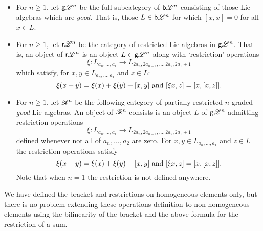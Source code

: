 \documentclass[11pt]{article}
\newcommand{\GS}[1]{\scrE^{#1}}
\newcommand{\RestLie}[1]{\mathsf{r}{\scrL}^{#1}}%
\newcommand{\GoodLie}[1]{\mathsf{g}{\scrL}^{#1}}%
\newcommand{\BadLie}[1]{\mathsf{b}{\scrL}^{#1}}%
\newcommand{\PRLie}[1]{\scrR^{#1}}%
\newcommand{\restn}[1]{\xi{#1}}
\newcommand{\Fr}[1]{#1}%
\begin{document}
\begin{CategoriesOfInterest}
\begin{itemize}
\item For $n\geq1$, let $\GoodLie{n}$ be the full subcategory of $\BadLie{n}$ consisting of those Lie algebras which are \emph{good}. That is, those $L\in\BadLie{n}$ for which $[x,x]=0$ for all $x\in L$.
\item For $n\geq1$, let $\RestLie{n}$ be the category of restricted Lie algebras in $\GoodLie{n}$. That is, an object of $\RestLie{n}$ is an object $L\in\GoodLie{n}$ along with `restriction' operations
\[\restn{}:L_{a_n,\ldots,a_1}\to L_{2a_n,2a_{n-1},\ldots,2a_2,2a_1+1}\]
which satisfy, for $x,y\in L_{a_n,\ldots,a_1}$ and $z\in L$: \[\restn{(x+y)}=\restn{(x)}+\restn{(y)}+[x,y]\textup{ and }[\restn{x},z]=[x,[x,z]].\]
\item For $n\geq1$, let $\PRLie{n}$ be the following category of partially restricted $n$-graded \emph{good} Lie algebras. An object of $\PRLie{n}$ consists is an object $L$ of $\GoodLie{n}$
admitting restriction operations
\[\restn{}:L_{a_n,\ldots,a_1}\to L_{2a_n,2a_{n-1},\ldots,2a_2,2a_1+1}\]
defined whenever not all of $a_n,\ldots,a_{2}$ are zero. %
For $x,y\in L_{a_n,\ldots,a_1}$ and $z\in L$ the restriction operations satisfy \[\restn{(x+y)}=\restn{(x)}+\restn{(y)}+[x,y]\textup{ and }[\restn{x},z]=[x,[x,z]].\]
Note that when $n=1$ the restriction is not defined anywhere.
\end{itemize}
We have defined the bracket and restrictions on homogeneous elements only, but there is no problem extending these operations definition to non-homogeneous elements using the bilinearity of the bracket and the above formula for the restriction of a sum.


\end{CategoriesOfInterest}
\end{document}
